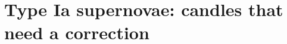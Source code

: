 \providecommand{\TwbaoCoverErr}{}\renewcommand{\TwbaoCoverErr}{0.5\%}
\providecommand{\TwbaoSigMed}{}\renewcommand{\TwbaoSigMed}{3.8}
\providecommand{\TwbaoSigLow}{}\renewcommand{\TwbaoSigLow}{2.7}
\providecommand{\TwbaoSigHigh}{}\renewcommand{\TwbaoSigHigh}{4.8}
\providecommand{\TwbaoAzero}{}\renewcommand{\TwbaoAzero}{1.030}
\providecommand{\TwbaoEzero}{}\renewcommand{\TwbaoEzero}{0.026}
\providecommand{\TwbaoDchiZero}{}\renewcommand{\TwbaoDchiZero}{13.7}
\providecommand{\TwbaoChiZero}{}\renewcommand{\TwbaoChiZero}{11.8}
\providecommand{\TwbaoDofZero}{}\renewcommand{\TwbaoDofZero}{15}
\providecommand{\TwdOm}{}\renewcommand{\TwdOm}{0.296}
\providecommand{\TwdOmSd}{}\renewcommand{\TwdOmSd}{0.015}
\providecommand{\TwdHrd}{}\renewcommand{\TwdHrd}{101.8}
\providecommand{\TwdHrdSd}{}\renewcommand{\TwdHrdSd}{1.3}
\providecommand{\TwdCorr}{}\renewcommand{\TwdCorr}{-0.92}
\providecommand{\TwdChiP}{}\renewcommand{\TwdChiP}{21.1}
\providecommand{\TwdNdata}{}\renewcommand{\TwdNdata}{12}
\providecommand{\TwdChiMin}{}\renewcommand{\TwdChiMin}{12.8}
\providecommand{\TwdHrdP}{}\renewcommand{\TwdHrdP}{99.1}
\providecommand{\TwdHzero}{}\renewcommand{\TwdHzero}{69.2}
\providecommand{\TwdHzeroErr}{}\renewcommand{\TwdHzeroErr}{0.9}
\providecommand{\TwpN}{}\renewcommand{\TwpN}{20000}
\providecommand{\TwpZzero}{}\renewcommand{\TwpZzero}{0.55}
\providecommand{\TwpNmadF}{}\renewcommand{\TwpNmadF}{0.018}
\providecommand{\TwpOutF}{}\renewcommand{\TwpOutF}{9.8}
\providecommand{\TwpNmadP}{}\renewcommand{\TwpNmadP}{0.019}
\providecommand{\TwpOutP}{}\renewcommand{\TwpOutP}{4.3}
\providecommand{\TwpMedP}{}\renewcommand{\TwpMedP}{0.0000}
\providecommand{\TwpBinLo}{}\renewcommand{\TwpBinLo}{0.8}
\providecommand{\TwpBinHi}{}\renewcommand{\TwpBinHi}{1.2}
\providecommand{\TwpBinN}{}\renewcommand{\TwpBinN}{6199}
\providecommand{\TwpMeanTrue}{}\renewcommand{\TwpMeanTrue}{0.965}
\providecommand{\TwpMeanZp}{}\renewcommand{\TwpMeanZp}{0.975}
\providecommand{\TwpMeanStack}{}\renewcommand{\TwpMeanStack}{0.975}
\providecommand{\TwpBinOut}{}\renewcommand{\TwpBinOut}{0.4}
\providecommand{\TwpZb}{}\renewcommand{\TwpZb}{2.00}
\providecommand{\TwpCondA}{}\renewcommand{\TwpCondA}{1.449}
\providecommand{\TwpCondB}{}\renewcommand{\TwpCondB}{1.407}
\providecommand{\TwpCondZ}{}\renewcommand{\TwpCondZ}{1.5}
\providecommand{\TwpCondAlow}{}\renewcommand{\TwpCondAlow}{0.531}
\providecommand{\TwpCondBlow}{}\renewcommand{\TwpCondBlow}{0.500}
\providecommand{\TwpCondZlow}{}\renewcommand{\TwpCondZlow}{0.5}
 
\section{Type Ia supernovae: candles that need a correction}
\label{T2b:sec:snia}

